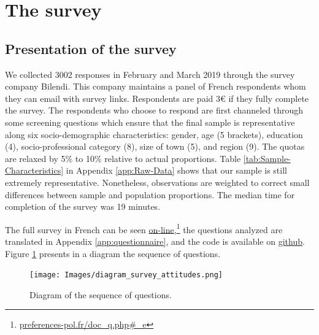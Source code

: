 \documentclass[english,5p,authoryear]{elsarticle}
\begin{document}
\section{The survey}\label{sec:survey}

    \subsection{Presentation of the survey}

We collected 3002 responses in February and March 2019 through the survey company Bilendi. This company maintains a panel of French respondents whom they can email with survey links. Respondents are
paid 3\euro{} if they fully complete the survey. The respondents who choose to respond are first channeled through some screening questions which ensure that the final sample is representative along six socio-demographic characteristics: gender, age (5 brackets), education (4), socio-professional category (8), size of town (5), and region (9). The quotas are relaxed by 5\% to 10\% relative to actual proportions. Table \ref{tab:Sample-Characteristics} in Appendix \ref{app:Raw-Data} shows that our sample is still extremely representative. Nonetheless, observations are weighted to correct small differences between sample and population proportions. The median time for completion of the survey was 19 minutes. 

The full survey in French can be seen \href{http://preferences-pol.fr/doc_q.php#_e}{on-line},\footnote{\href{http:\/\/preferences-pol.fr\/doc\_q.php\#\_e}{preferences-pol.fr/doc\_q.php\#\_e}} the questions analyzed are translated in Appendix \ref{app:questionnaire}, and the code is available on \hyperlink{https://github.com/bixiou/beliefs_climate_policies}{github}. Figure \ref{fig:survey} presents in a diagram the sequence of  questions.

\begin{figure}[!htbp]
\centering
\texttt{[image: Images/diagram\_survey\_attitudes.png]}
\caption{Diagram of the sequence of questions.}
\label{fig:survey}
\end{figure}
\end{document}

